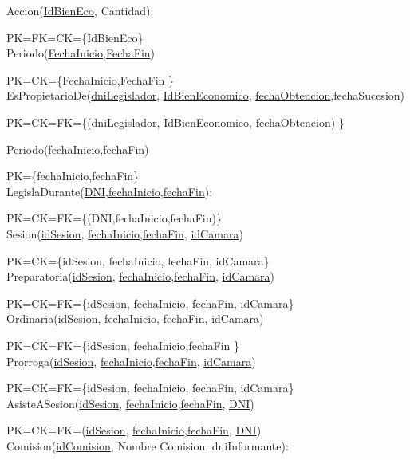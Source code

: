 Accion(\underline{IdBienEco}, Cantidad):

PK=FK=CK={\{IdBienEco}\}\\

Periodo(\underline{FechaInicio},\underline{FechaFin})

PK=CK={\{FechaInicio,FechaFin }\}\\

EsPropietarioDe(\underline{dniLegislador}, \underline{IdBienEconomico}, \underline{fechaObtencion},fechaSucesion)

PK=CK=FK={\{(dniLegislador, IdBienEconomico, fechaObtencion) }\}

Periodo(fechaInicio,fechaFin)

PK={\{fechaInicio,fechaFin}\}\\

LegislaDurante(\underline{DNI},\underline{fechaInicio},\underline{fechaFin}):

PK=CK=FK={\{(DNI,fechaInicio,fechaFin)}\}\\

Sesion(\underline{idSesion}, \underline{fechaInicio},\underline{fechaFin}, \underline{idCamara})

PK=CK={\{idSesion, fechaInicio, fechaFin, idCamara}\}\\

Preparatoria(\underline{idSesion}, \underline{fechaInicio},\underline{fechaFin}, \underline{idCamara})

PK=CK=FK={\{idSesion, fechaInicio, fechaFin, idCamara}\}\\

Ordinaria(\underline{idSesion}, \underline{fechaInicio}, \underline{fechaFin}, \underline{idCamara})

PK=CK=FK={\{idSesion, fechaInicio,fechaFin }\}\\

Prorroga(\underline{idSesion}, \underline{fechaInicio},\underline{fechaFin}, \underline{idCamara})

PK=CK=FK={\{idSesion, fechaInicio, fechaFin, idCamara}\}\\

AsisteASesion(\underline{idSesion}, \underline{fechaInicio},\underline{fechaFin}, \underline{DNI})

PK=CK=FK=(\underline{idSesion}, \underline{fechaInicio},\underline{fechaFin}, \underline{DNI})\\

Comision(\underline{idComision}, Nombre Comision, dniInformante):

